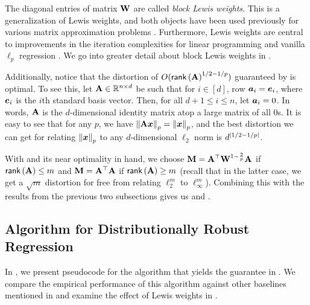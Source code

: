 The diagonal entries of matrix $\mathbf{W}$ are called \textit{block Lewis weights}. This is a generalization of Lewis weights, and both objects have been used previously for various matrix approximation problems \citep{blm89,mmwy21,jls22,jlls23,mo23}. Furthermore, Lewis weights are central to improvements in the iteration complexities for linear programming and vanilla $\ell_p$ regression \citep{ls19,jls21}. We go into greater detail about block Lewis weights in . 

Additionally, notice that the distortion of $O(\mathsf{rank}\left(\mathbf{A}\right)^{1/2-1/p})$ guaranteed by  is optimal. To see this, let $\mathbf{A} \in \mathbb{R}^{n \times d}$ be such that for $i\in[d]$, row $\bm{a}_i=\bm{e}_i$, where $\bm{e}_i$ is the $i$th standard basis vector. Then, for all $d+1 \le i \le n$, let $\bm{a}_i=0$. In words, $\mathbf{A}$ is the $d$-dimensional identity matrix atop a large matrix of all $0$s. It is easy to see that for any $p$, we have $\left\lVert \mathbf{A}\bm{x} \right\rVert_p = \left\lVert \bm{x} \right\rVert_p$, and the best distortion we can get for relating $\left\lVert \bm{x} \right\rVert_p$ to any $d$-dimensional $\ell_2$ norm is $d^{\left\lvert 1/2-1/p \right\rvert}$.

With  and its near optimality in hand, we choose $\mathbf{M} = \mathbf{A}^{\top}\mathbf{W}^{1-\frac{2}{p}}\mathbf{A}$ if $\mathsf{rank}\left(\mathbf{A}\right) \le m$ and $\mathbf{M} = \mathbf{A}^{\top}\mathbf{A}$ if $\mathsf{rank}\left(\mathbf{A}\right) \ge m$ (recall that in the latter case, we get a $\sqrt{m}$ distortion for free from relating $\ell_2^m$ to $\ell_{\infty}^m$). Combining this with the results from the previous two subsections gives us  and .

\subsection{Algorithm for Distributionally Robust Regression}

In , we present pseudocode for the algorithm that yields the guarantee in . We compare the empirical performance of this algorithm against other baselines mentioned in  and examine the effect of Lewis weights in .

